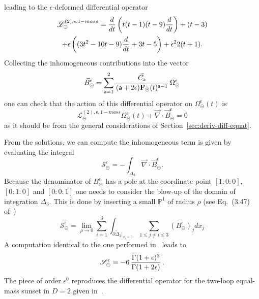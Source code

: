 \documentclass[a4paper,12pt]{article}
\numberwithin{equation}{section}
\numberwithin{figure}{section}
\def\su{\circleddash}
\begin{document}
leading to the $\epsilon$-deformed differential operator
\begin{multline}
  \label{e:PF2sunset1massepsilon}
     \mathscr{L}^{(2),\epsilon,1-mass}_\su ={d\over dt}\left( t(t-1)(t-9)
       {d\over dt}\right)+(t-3)\cr+\epsilon\left((3t^2-10t-9) {d\over
         dt}+3t-5\right)
     +\epsilon^2 2(t+1).
\end{multline}
%
Collecting the inhomogeneous contributions into the vector
\begin{equation}
  \vec B_\su^\epsilon=\sum_{\mathsf{a}=1}^2 {\vec C_{\mathsf{a}}\over
    (\mathsf{a}+2\epsilon)\textbf{F}_\su(t)^{\mathsf{a}-1}}\, \Omega_\su^\epsilon
\end{equation}
one can check that the action of this differential operator on
$\Omega_{\su}^\epsilon(t)$ is
\begin{equation}
      \mathscr{L}^{(2),\epsilon,1-mass}_\su
      \Omega_{\su}^\epsilon(t)+\vec\nabla \cdot\vec B_\su^\epsilon=0
    \end{equation}
as it should be from the general considerations of Section~\ref{sec:deriv-diff-equat}.


\medskip
From the solutions, we can compute the  inhomogeneous term is given by evaluating the integral 
\begin{equation}
  \mathscr{S}_\su^\epsilon
  =-\int_{\Delta_3} \vec\nabla\cdot\vec B^\epsilon_\su.
\end{equation}
%
Because the denominator of $ B^\epsilon_\su$ has a pole at the coordinate
point $[1:0:0]$, $[0:1:0]$ and $[0:0:1]$ one needs to consider the
blow-up  of the domain of integration $\Delta_3$. This is done by inserting a small
$\mathbb P^1$ of radius $\rho$ (see Eq.~(3.47) of~\cite{Bloch:2016izu})
\begin{equation}
    \mathscr{S}_\su^\epsilon=\lim_{\rho\to0} \sum_{i=1}^3
    \int_{\partial\tilde\Delta_3|_{x_i=0}} \sum_{1\leq j\neq i\leq 3}
    (B^\epsilon_\su)_j dx_j
\end{equation}
A computation identical to the one performed in~\cite{Bloch:2016izu} leads to
\begin{equation}
 \mathscr{S}_\su^\epsilon=  -6 \, {\Gamma(1+\epsilon)^2\over \Gamma(1+2\epsilon)} \, . 
\end{equation}
The piece of order $\epsilon^0$ reproduces the differential operator
for the two-loop equal-mass sunset in $D=2$ given
in~\cite{Bloch:2013tra,Bloch:2013tra,Vanhove:2014wqa,Bonisch:2020qmm,Pogel:2022vat}.

\end{document}
